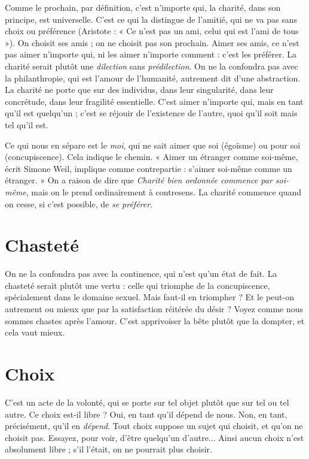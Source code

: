 Comme le prochain, par définition, c’est n’importe qui, la charité, dans son
principe, est universelle. C’est ce qui la distingue de l’amitié, qui ne va pas sans
choix ou préférence (Aristote : « Ce n’est pas un ami, celui qui est l’ami de
tous »). On choisit ses amis ; on ne choisit pas son prochain. Aimer ses amis, ce
n'est pas aimer n'importe qui, ni les aimer n’importe comment : c’est les préférer.
La charité serait plutôt une {\it dilection} sans {\it prédilection}. On ne la confondra
pas avec la philanthropie, qui est l’amour de l'humanité, autrement dit d’une
abstraction. La charité ne porte que sur des individus, dans leur singularité,
dans leur concrétude, dans leur fragilité essentielle. C’est aimer n’importe qui,
mais en tant qu’il est quelqu'un ; c’est se réjouir de l’existence de l’autre, quoi
qu’il soit mais tel qu’il est.

Ce qui nous en sépare est le {\it moi}, qui ne sait aimer que soi (égoïsme) ou
pour soi (concupiscence). Cela indique le chemin. « Aimer un étranger comme
soi-même, écrit Simone Weil, implique comme contrepartie : s’aimer soi-même
comme un étranger. » On a raison de dire que {\it Charité bien ordonnée
commence par soi-même}, mais on le prend ordinairement à contresens. La charité
commence quand on cesse, si c’est possible, de {\it se préférer}.

\section{Chasteté}
On ne la confondra pas avec la continence, qui n’est qu’un
état de fait. La chasteté serait plutôt une vertu : celle qui
triomphe de la concupiscence, spécialement dans le domaine sexuel. Mais faut-il
en triompher ? Et le peut-on autrement ou mieux que par la satisfaction réitérée
du désir ? Voyez comme nous sommes chastes après l’amour. C’est apprivoiser
la bête plutôt que la dompter, et cela vaut mieux.

\section{Choix}
C'est un acte de la volonté, qui se porte sur tel objet plutôt que sur
tel ou tel autre. Ce choix est-il libre ? Oui, en tant qu’il dépend de
nous. Non, en tant, précisément, qu’il en {\it dépend}. Tout choix suppose un sujet
qui choisit, et qu’on ne choisit pas. Essayez, pour voir, d’être quelqu'un
d’autre... Ainsi aucun choix n’est absolument libre ; s’il l'était, on ne pourrait
plus choisir.

